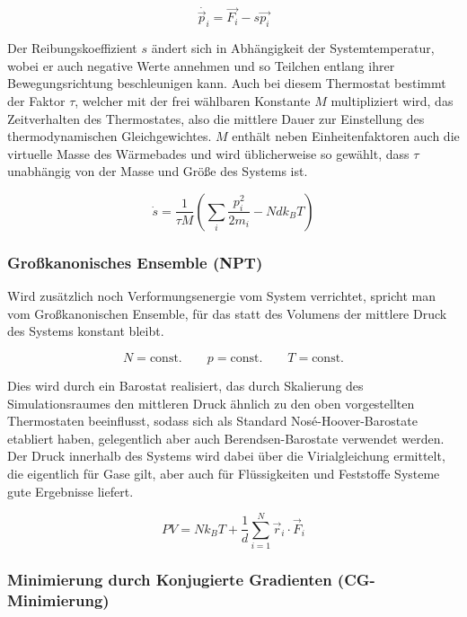 \begin{equation}
  \dot{\vec p_i} = \vec{F_i} - s \vec{p_i}
\end{equation}

Der Reibungskoeffizient $s$ ändert sich in Abhängigkeit der Systemtemperatur, wobei er auch negative Werte annehmen und so Teilchen entlang ihrer Bewegungsrichtung beschleunigen kann.
Auch bei diesem Thermostat bestimmt der Faktor $\tau$, welcher mit der frei wählbaren Konstante $M$ multipliziert wird, das Zeitverhalten des Thermostates, also die mittlere Dauer zur Einstellung des thermodynamischen Gleichgewichtes.
$M$ enthält neben Einheitenfaktoren auch die virtuelle Masse des Wärmebades und wird üblicherweise so gewählt, dass $\tau$ unabhängig von der Masse und Größe des Systems ist.

\begin{equation}
  \dot s = \frac{1}{\tau M} \left(\sum_i{\frac{p_i^2}{2m_i}} - N d k_B T\right)
\end{equation}

\subsubsection{Großkanonisches Ensemble (NPT)}

Wird zusätzlich noch Verformungsenergie vom System verrichtet, spricht man vom Großkanonischen Ensemble, für das statt des Volumens der mittlere Druck des Systems konstant bleibt.

\begin{equation}
  N = \text{const.}
  \qquad
  p = \text{const.}
  \qquad
  T = \text{const.}
\end{equation}

Dies wird durch ein Barostat realisiert, das durch Skalierung des Simulationsraumes den mittleren Druck ähnlich zu den oben vorgestellten Thermostaten beeinflusst, sodass sich als Standard Nosé-Hoover-Barostate etabliert haben, gelegentlich aber auch Berendsen-Barostate verwendet werden.
Der Druck innerhalb des Systems wird dabei über die Virialgleichung ermittelt, die eigentlich für Gase gilt, aber auch für Flüssigkeiten und Feststoffe Systeme gute Ergebnisse liefert.

\begin{equation}
  PV = N k_B T + \frac{1}{d} \sum_{i=1}^N{\vec{r}_i \cdot \vec{F}_i}
\end{equation}

\subsubsection{Minimierung durch Konjugierte Gradienten (CG-Minimierung)}


